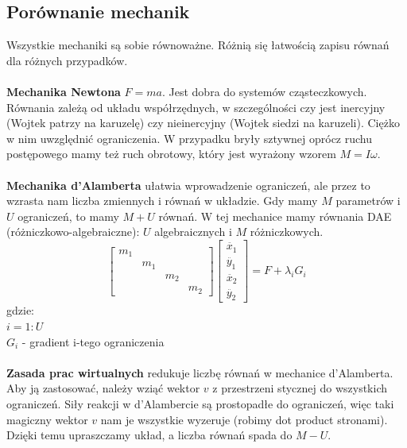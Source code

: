 \documentclass[12pt]{article}
\begin{document}
\subsection{Porównanie mechanik}
Wszystkie mechaniki są sobie równoważne. Różnią się łatwością zapisu równań dla różnych przypadków.\\
~\\
\textbf{Mechanika Newtona} $F = ma$. Jest dobra do systemów cząsteczkowych. Równania zależą od układu współrzędnych, w szczególności czy jest inercyjny (Wojtek patrzy na karuzelę) czy nieinercyjny (Wojtek siedzi na karuzeli). Ciężko w nim uwzględnić ograniczenia. W przypadku bryły sztywnej oprócz ruchu postępowego mamy też ruch obrotowy, który jest wyrażony wzorem $M = I\omega$. \\
~\\
\textbf{Mechanika d'Alamberta} ułatwia wprowadzenie ograniczeń, ale przez to wzrasta nam liczba zmiennych i równań w układzie. Gdy mamy $M$ parametrów i $U$ ograniczeń, to mamy $M + U$ równań.
W tej mechanice mamy równania DAE (różniczkowo-algebraiczne): $U$ algebraicznych i $M$ różniczkowych.
\begin{equation} 	
	\begin{bmatrix}
	m_{1}  &   &   &  
	\\[0.3em]
	  & m_{1} &  &   
	\\[0.3em]
	  &  & m_{2} &  
	  \\[0.3em]
	  &  &  & m_{2}
	\end{bmatrix}
	\begin{bmatrix}
	\ddot{x_{1}}  
	\\[0.3em]
	\ddot{y_{1}}   
	\\[0.3em]
	\ddot{x_{2}}  
	\\[0.3em]
	\ddot{y_{2}}
	\end{bmatrix}
	= F + \lambda _{i} G_{i}	
\end{equation}
gdzie: \\
$i=1:U$ \\
$G_{i}$ - gradient i-tego ograniczenia \\
~\\
\textbf{Zasada prac wirtualnych} redukuje liczbę równań w mechanice d'Alamberta. Aby ją zastosować, należy wziąć wektor $v$ z przestrzeni stycznej do wszystkich ograniczeń. Siły reakcji w d'Alambercie są prostopadłe do ograniczeń, więc taki magiczny wektor $v$ nam je wszystkie wyzeruje (robimy dot product stronami). Dzięki temu upraszczamy układ, a liczba równań spada do $M - U$.\\
\end{document}
